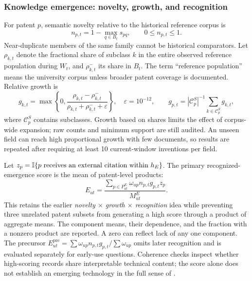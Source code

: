 \subsubsection{Knowledge emergence: novelty, growth, and recognition}
For patent $p$, semantic novelty relative to the historical reference corpus is
\begin{equation}
 n_{p,t}=1-\max_{q\in B_t}s_{pq},\qquad 0\leq n_{p,t}\leq1.
 \label{eq:novelty}
\end{equation}
Near-duplicate members of the same family cannot be historical comparators.
Let $\rho_{k,t}$ denote the fractional share of subclass $k$ in the entire
observed reference population during $W_t$, and $\rho_{k,t}^{-}$ its share in
$B_t$. The term ``reference population'' means the university corpus unless
broader patent coverage is documented. Relative growth is
\begin{equation}
 g_{k,t}=\max\left\{0,
 \frac{\rho_{k,t}-\rho_{k,t}^{-}}{\rho_{k,t}+\rho_{k,t}^{-}+\varepsilon}\right\},
 \quad\varepsilon=10^{-12},\qquad
 g_{p,t}=|\mathcal{C}^{S}_p|^{-1}\sum_{k\in\mathcal{C}^{S}_p}g_{k,t},
 \label{eq:growth}
\end{equation}
where $\mathcal{C}^{S}_p$ contains subclasses. Growth based on shares limits the
effect of corpus-wide expansion; raw counts and minimum support are still audited.
An unseen field can reach high proportional growth with few documents, so results
are repeated after requiring at least 10 current-window inventions per field.

Let $z_p=\mathbb{I}\{p\text{ receives an external citation within }h_E\}$.
The primary recognized-emergence score is the mean of patent-level products:
\begin{equation}
 E_{ut}=\frac{\sum_{p\in P_{ut}^{E}}\omega_{up}
              n_{p,t}g_{p,t}z_p}
              {M_{ut}^{E}}.
 \label{eq:emergence}
\end{equation}
This retains the earlier \emph{novelty $\times$ growth $\times$ recognition}
idea while preventing three unrelated patent subsets from generating a high
score through a product of aggregate means. The component means, their dependence,
and the fraction with a nonzero product are reported. A zero can reflect lack
of any one component. The precursor
$E^{\mathrm{pre}}_{ut}=\sum\omega_{up}n_{p,t}g_{p,t}/\sum\omega_{up}$
omits later recognition and is evaluated separately for early-use questions.
Coherence checks inspect whether high-scoring records share interpretable technical
content; the score alone does not establish an emerging technology in the full
sense of \citet{rotolo2015}.

